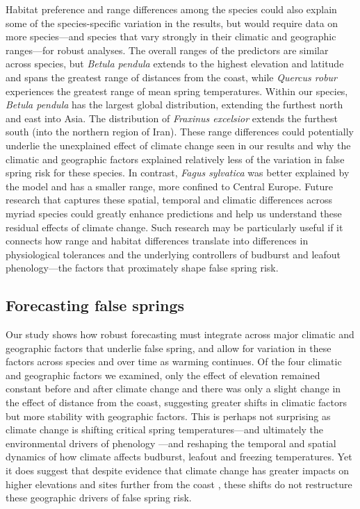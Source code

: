 \documentclass{article}\usepackage[]{graphicx}\usepackage[]{color}
\begin{document}
Habitat preference and range differences among the species could also explain some of the species-specific variation in the results, but would require data on more species---and species that vary strongly in their climatic and geographic ranges---for robust analyses. The overall ranges of the predictors are similar across species, but \textit{Betula pendula} extends to the highest elevation and latitude and spans the greatest range of distances from the coast, while \textit{Quercus robur} experiences the greatest range of mean spring temperatures. Within our species, \textit{Betula pendula} has the largest global distribution, extending the furthest north and east into Asia. The distribution of \textit{Fraxinus excelsior} extends the furthest south (into the northern region of Iran). These range differences could potentially underlie the unexplained effect of climate change seen in our results and why the climatic and geographic factors explained relatively less of the variation in false spring risk for these species. In contrast, \textit{Fagus sylvatica} was better explained by the model and has a smaller range, more confined to Central Europe. Future research that captures these spatial, temporal and climatic differences across myriad species could greatly enhance predictions and help us understand these residual effects of climate change. Such research may be particularly useful if it connects how range and habitat differences translate into differences in physiological tolerances and the underlying controllers of budburst and leafout phenology---the factors that proximately shape false spring risk. %


\subsection*{Forecasting false springs}
Our study shows how robust forecasting must integrate across major climatic and geographic factors that underlie false spring, and allow for variation in these factors across species and over time as warming continues. Of the four climatic and geographic factors we examined, only the effect of elevation remained constant before and after climate change and there was only a slight change in the effect of distance from the coast, suggesting greater shifts in climatic factors but more stability with geographic factors. This is perhaps not surprising as climate change is shifting critical spring temperatures---and ultimately the environmental drivers of phenology \citep{Gauzere2019}---and reshaping the temporal and spatial dynamics of how climate affects budburst, leafout and freezing temperatures.  Yet it does suggest that despite evidence that climate change has greater impacts on higher elevations and sites further from the coast \citep{Pepin2015, Rangwala2012, Giorgi1997,Vitasse2018}, these shifts do not restructure these geographic drivers of false spring risk.  
\end{document}
